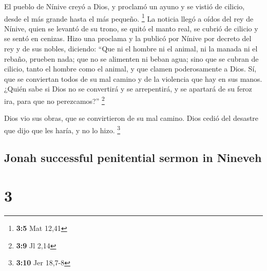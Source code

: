\begin{paracol}{2}
 El pueblo de Nínive creyó a Dios, y proclamó un ayuno y
se vistió de cilicio, desde el más grande hasta el más pequeño.
\footnote{\textbf{3:5} Mat 12,41}  La noticia llegó a
oídos del rey de Nínive, quien se levantó de su trono, se quitó el manto
real, se cubrió de cilicio y se sentó en cenizas.  Hizo
una proclama y la publicó por Nínive por decreto del rey y de sus
nobles, diciendo: ``Que ni el hombre ni el animal, ni la manada ni el
rebaño, prueben nada; que no se alimenten ni beban agua; 
sino que se cubran de cilicio, tanto el hombre como el animal, y que
clamen poderosamente a Dios. Sí, que se conviertan todos de su mal
camino y de la violencia que hay en sus manos.  ¿Quién
sabe si Dios no se convertirá y se arrepentirá, y se apartará de su
feroz ira, para que no perezcamos?'' \footnote{\textbf{3:9} Jl 2,14}

 Dios vio sus obras, que se convirtieron de su mal
camino. Dios cedió del desastre que dijo que les haría, y no lo hizo.
\footnote{\textbf{3:10} Jer 18,7-8}

\switchcolumn
\begin{otherlanguage}{english}

\hypertarget{jonah-successful-penitential-sermon-in-nineveh}{%
\subsection{Jonah successful penitential sermon in
Nineveh}\label{jonah-successful-penitential-sermon-in-nineveh}}

\hypertarget{section-5}{%
\section{3}\label{section-5}}


\end{otherlanguage}
\end{paracol}
